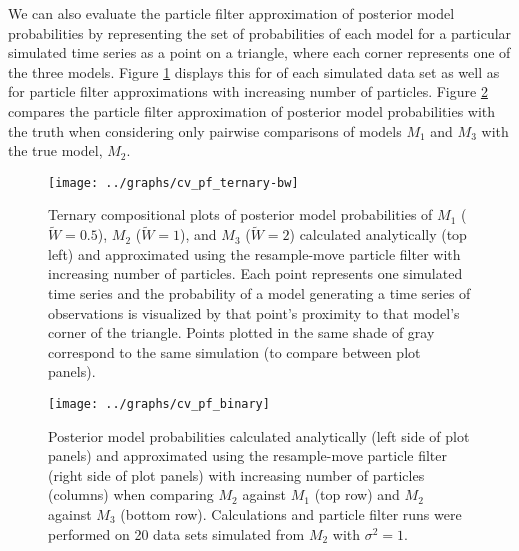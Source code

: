 \documentclass{article}
\begin{document}
We can also evaluate the particle filter approximation of posterior model probabilities by representing the set of probabilities of each model for a particular simulated time series as a point on a triangle, where each corner represents one of the three models. Figure \ref{fig:ternary} displays this for of each simulated data set as well as for particle filter approximations with increasing number of particles. Figure \ref{fig:binary} compares the particle filter approximation of posterior model probabilities with the truth when considering only pairwise comparisons of models $M_1$ and $M_3$ with the true model, $M_2$.

\begin{figure}
\texttt{[image: ../graphs/cv\_pf\_ternary-bw]}
\caption{Ternary compositional plots of posterior model probabilities of $M_1$ ($\tilde{W} = 0.5$), $M_2$ ($\tilde{W} = 1$), and $M_3$ ($\tilde{W} = 2$) calculated analytically (top left) and approximated using the resample-move particle filter with increasing number of particles. Each point represents one simulated time series and the probability of a model generating a time series of observations is visualized by that point's proximity to that model's corner of the triangle. Points plotted in the same shade of gray correspond to the same simulation (to compare between plot panels).} \label{fig:ternary}
\end{figure}

\begin{figure}
\texttt{[image: ../graphs/cv\_pf\_binary]}
\caption{Posterior model probabilities calculated analytically (left side of plot panels) and approximated using the resample-move particle filter (right side of plot panels) with increasing number of particles (columns) when comparing $M_2$ against $M_1$ (top row) and $M_2$ against $M_3$ (bottom row). Calculations and particle filter runs were performed on 20 data sets simulated from $M_2$ with $\sigma^2 = 1$.} \label{fig:binary}
\end{figure}

\clearpage



\end{document}
